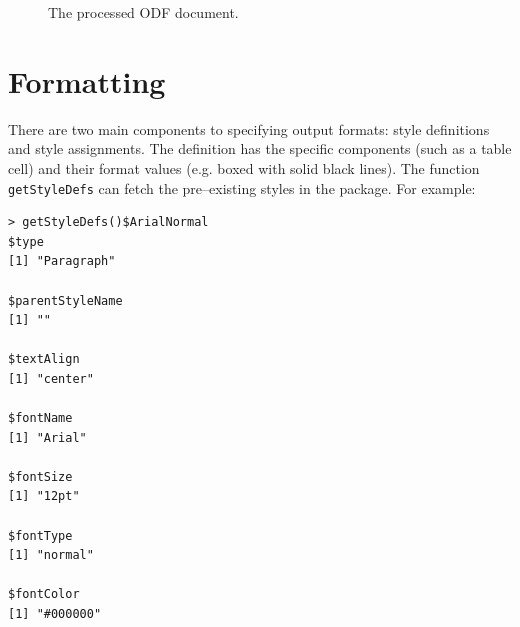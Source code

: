 \documentclass[12pt]{article}
\begin{document}
\begin{figure}[p]
\begin{center}
\end{center}
\caption{\label{figure:after}
The processed ODF document.}
\end{figure}


\section{Formatting}

There are two main components to specifying output formats: style definitions and style assignments. The definition has the specific components (such as a table cell) and their format values (e.g. boxed with solid black lines). The function \texttt{getStyleDefs} can fetch the pre--existing styles in the package. For example:

\begin{verbatim}
> getStyleDefs()$ArialNormal
$type
[1] "Paragraph"

$parentStyleName
[1] ""

$textAlign
[1] "center"

$fontName
[1] "Arial"

$fontSize
[1] "12pt"

$fontType
[1] "normal"

$fontColor
[1] "#000000"
\end{verbatim}
\end{document}
